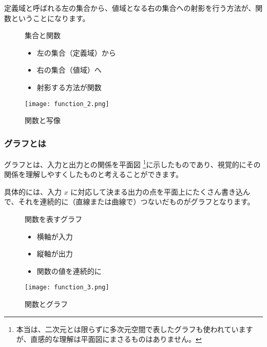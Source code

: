 \documentclass[uplatex,dvipdfmx,a4paper,11pt]{jsarticle}
\begin{document}
定義域と呼ばれる左の集合から、値域となる右の集合への射影を行う方法が、関数ということになります。
\begin{figure}[htb]
	\begin{center}
		\begin{minipage}{0.45\textwidth}
			\large
			\begin{itembox}[l]{集合と関数}
				\begin{itemize}
					\item 左の集合（定義域）から
					\item 右の集合（値域）へ
					\item 射影する方法が関数
				\end{itemize}
			\end{itembox}
		\end{minipage}
		\begin{minipage}{0.45\textwidth}
			\begin{center}
			\texttt{[image: function\_2.png]}
			\end{center}
		\end{minipage}
		\caption{関数と写像}
		\label{function_2}
	\end{center}
\end{figure}

\subsubsection{グラフとは}
グラフとは、入力と出力との関係を平面図
\footnote{
	本当は、二次元とは限らずに多次元空間で表したグラフも使われていますが、直感的な理解は平面図にまさるものはありません。
}に示したものであり、視覚的にその関係を理解しやすくしたものと考えることができます。

具体的には、入力 $x$ に対応して決まる出力の点を平面上にたくさん書き込んで、それを連続的に（直線または曲線で）つないだものがグラフとなります。
\begin{figure}[htb]
	\begin{center}
		\begin{minipage}{0.45\textwidth}
			\large
			\begin{itembox}[l]{関数を表すグラフ}
				\begin{itemize}
					\item 横軸が入力
					\item 縦軸が出力
					\item 関数の値を連続的に
				\end{itemize}
			\end{itembox}
		\end{minipage}
		\begin{minipage}{0.45\textwidth}
			\begin{center}
			\texttt{[image: function\_3.png]}
			\end{center}
		\end{minipage}
		\caption{関数とグラフ}
		\label{function_3}
	\end{center}
\end{figure}
\end{document}
